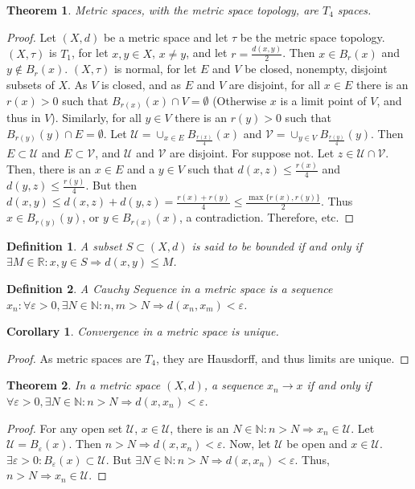 \documentclass[12pt,oneside]{book}
\theoremstyle{mystyle}
\newtheorem{theorem}{Theorem}[section]
\newtheorem{definition}{Definition}[section]
\newtheorem{corollary}{Corollary}[section]
\begin{document}
\begin{theorem}
Metric spaces, with the metric space topology, are $T_4$ spaces.
\end{theorem}
\begin{proof}
Let $(X,d)$ be a metric space and let $\tau$ be the metric space topology. $(X,\tau)$ is $T_1$, for let $x,y\in X$, $x\ne y$, and let $r= \frac{d(x,y)}{2}$. Then $x\in B_{r}(x)$ and $y\notin B_{r}(x)$. $(X,\tau)$ is normal, for let $E$ and $V$ be closed, nonempty, disjoint subsets of $X$. As $V$ is closed, and as $E$ and $V$ are disjoint, for all $x\in E$ there is an $r(x)>0$ such that $B_{r(x)}(x)\cap V = \emptyset$ (Otherwise $x$ is a limit point of $V$, and thus in $V$). Similarly, for all $y\in V$ there is an $r(y)>0$ such that $B_{r(y)}(y)\cap E = \emptyset$. Let $\mathcal{U} = \cup_{x\in E}B_{\frac{r(x)}{4}}(x)$ and $\mathcal{V} = \cup_{y\in V}B_{\frac{r(y)}{4}}(y)$. Then $E\subset \mathcal{U}$ and $E\subset \mathcal{V}$, and $\mathcal{U}$ and $\mathcal{V}$ are disjoint. For suppose not. Let $z\in \mathcal{U}\cap \mathcal{V}$. Then, there is an $x\in E$ and a $y\in V$ such that $d(x,z)\leq \frac{r(x)}{4}$ and $d(y,z)\leq \frac{r(y)}{4}$. But then $d(x,y) \leq d(x,z)+d(y,z) = \frac{r(x)+r(y)}{4} \leq \frac{\max\{r(x),r(y)\}}{2}$. Thus $x\in B_{r(y)}(y)$, or $y\in B_{r(x)}(x)$, a contradiction. Therefore, etc.
\end{proof}

\begin{definition}
A subset $S\subset (X,d)$ is said to be bounded if and only if $\exists M\in \mathbb{R}:x,y\in S\Rightarrow d(x,y)\leq M$.
\end{definition}

\begin{definition}
A Cauchy Sequence in a metric space is a sequence $x_n:\forall \varepsilon>0,\exists N\in \mathbb{N}:n,m>N\Rightarrow d(x_n,x_m)<\varepsilon$.
\end{definition}

\begin{corollary}
Convergence in a metric space is unique.
\end{corollary}
\begin{proof}
As metric spaces are $T_4$, they are Hausdorff, and thus limits are unique.
\end{proof}

\begin{theorem}
In a metric space $(X,d)$, a sequence $x_n\rightarrow x$ if and only if $\forall\varepsilon>0,\exists N\in \mathbb{N}:n>N\Rightarrow d(x,x_n)<\varepsilon$.
\end{theorem}
\begin{proof}
For any open set $\mathcal{U}$, $x\in \mathcal{U}$, there is an $N\in \mathbb{N}:n>N\Rightarrow x_n \in \mathcal{U}$. Let $\mathcal{U}=B_{\varepsilon}(x)$. Then $n>N\Rightarrow d(x,x_n)<\varepsilon$. Now, let $\mathcal{U}$ be open and $x\in \mathcal{U}$. $\exists\varepsilon>0:B_{\varepsilon}(x)\subset \mathcal{U}$. But $\exists N\in \mathbb{N}:n>N\Rightarrow d(x,x_n)<\varepsilon$. Thus, $n>N\Rightarrow x_n\in \mathcal{U}$.
\end{proof}
\end{document}
